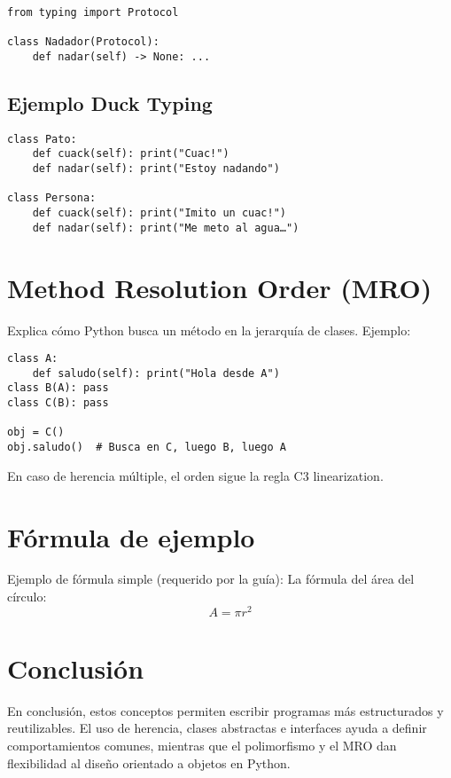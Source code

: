 \documentclass[12pt]{article}
\begin{document}
\begin{verbatim}
from typing import Protocol

class Nadador(Protocol):
    def nadar(self) -> None: ...
\end{verbatim}

\subsection{Ejemplo Duck Typing}
\begin{verbatim}
class Pato:
    def cuack(self): print("Cuac!")
    def nadar(self): print("Estoy nadando")

class Persona:
    def cuack(self): print("Imito un cuac!")
    def nadar(self): print("Me meto al agua…")
\end{verbatim}

\section{Method Resolution Order (MRO)}
Explica cómo Python busca un método en la jerarquía de clases. Ejemplo:

\begin{verbatim}
class A: 
    def saludo(self): print("Hola desde A")
class B(A): pass
class C(B): pass

obj = C()
obj.saludo()  # Busca en C, luego B, luego A
\end{verbatim}

En caso de herencia múltiple, el orden sigue la regla C3 linearization.

\section{Fórmula de ejemplo}
Ejemplo de fórmula simple (requerido por la guía):
La fórmula del área del círculo:
\[
A = \pi r^2
\]

\section{Conclusión}
En conclusión, estos conceptos permiten escribir programas más estructurados y reutilizables. 
El uso de herencia, clases abstractas e interfaces ayuda a definir comportamientos comunes, 
mientras que el polimorfismo y el MRO dan flexibilidad al diseño orientado a objetos en Python.
\end{document}
